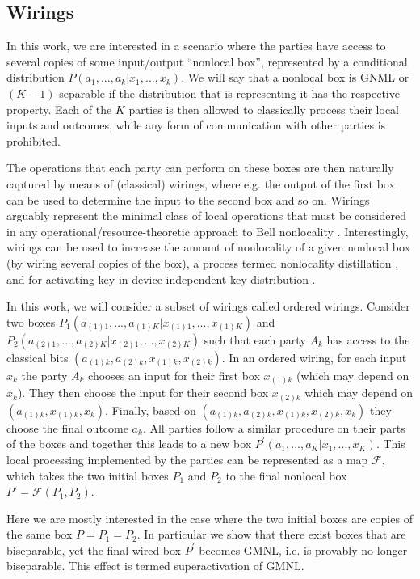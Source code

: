 \documentclass[pra,aps,reprint,superscriptaddress]{revtex4-2}
\theoremstyle{theorem}
\begin{document}
\subsection{Wirings}


In this work, we are interested in a scenario where the parties have access to several copies of some input/output ``nonlocal box'', represented by a conditional distribution $P(a_1,...,a_k|x_1,...,x_k)$. We will say that a nonlocal box is GNML or $(K-1)$-separable if the distribution that is representing it has the respective property.  Each of the $K$ parties is then allowed to classically process their local inputs and outcomes, while any form of communication with other parties is prohibited. 


The operations that each party can perform on these boxes are then naturally captured by means of (classical) wirings, where e.g. the output of the first box can be used to determine the input to the second box and so on. Wirings arguably represent the minimal class of local operations that must be considered in any operational/resource-theoretic approach to Bell nonlocality \cite{Barrett_2005}. Interestingly, wirings can be used to increase the amount of nonlocality of a given nonlocal box (by wiring several copies of the box), a process termed nonlocality distillation \cite{Forster_2009,Brunner_2009,Hoyer_2010, Brito_2019,Eftaxias_2023,Naik_2023,Hoyer_2026}, and for activating key in device-independent key distribution \cite{Ulu_2025}. 


In this work, we will consider a subset of wirings called ordered wirings. 
Consider two boxes $P_1(a_{(1)1},...,a_{(1)K}|x_{(1)1},...,x_{(1)K})$ and $P_2(a_{(2)1},...,a_{(2)K}|x_{(2)1},...,x_{(2)K})$ such that each party $A_k$ has access to the classical bits $(a_{(1)k},a_{(2)k},x_{(1)k},x_{(2)k})$. In an ordered wiring, for each input $x_k$ the party $A_k$ chooses an input for their first box $x_{(1)k}$ (which may depend on $x_k$). They then choose the input for their second box $x_{(2)k}$ which may depend on $(a_{(1)k},x_{(1)k},x_k)$. Finally, based on  $(a_{(1)k},a_{(2)k},x_{(1)k},x_{(2)k},x_k)$ they choose the final outcome $a_k$. All parties follow a similar procedure on their parts of the boxes and together this leads to a new box $P^{\prime}(a_1,...,a_K|x_1,...,x_K)$. This local processing implemented by the parties can be represented as a map $\mathcal{F}$, which takes the two initial boxes $P_1$ and $P_2$ to the final nonlocal box $P'=\mathcal{F}(P_1,P_2)$. 

Here we are mostly interested in the case where the two initial boxes are copies of the same box $P=P_1=P_2$. In particular we show that there exist boxes that are biseparable, yet the final wired box $P^\prime$ becomes GMNL, i.e. is provably no longer biseparable. This effect is termed superactivation of GMNL.
\end{document}

